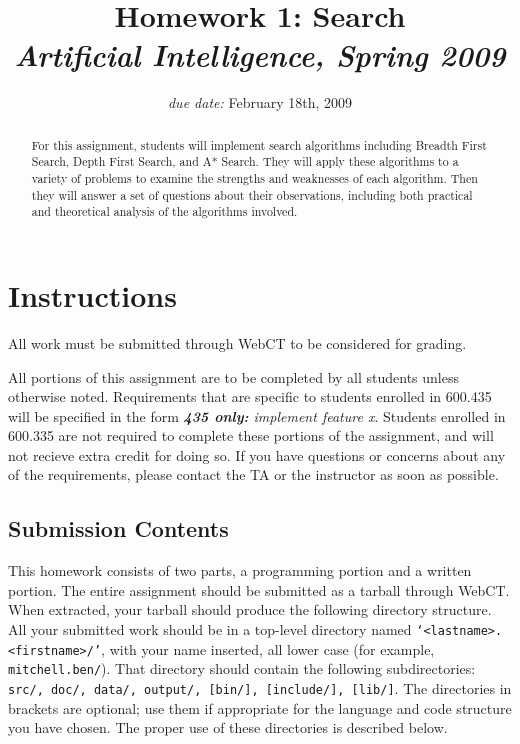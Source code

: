 \documentclass[12pt]{article}
\title{Homework 1: Search\\ \normalsize\emph{Artificial Intelligence, Spring 2009}}
\date{\emph{due date:} February 18th, 2009}
\newcommand{\ttt}[1]{\texttt{#1}}
\begin{document}
\maketitle

\begin{abstract}
  For this assignment, students will implement search algorithms including
  Breadth First Search, Depth First Search, and A* Search.  They will apply
  these algorithms to a variety of problems to examine the strengths and
  weaknesses of each algorithm.  Then they will answer a set of questions about
  their observations, including both practical and theoretical analysis of the
  algorithms involved.
\end{abstract}

\section{Instructions}

All work must be submitted through WebCT to be considered for grading.

All portions of this assignment are to be completed by all students unless
otherwise noted.  Requirements that are specific to students enrolled in 600.435
will be specified in the form \emph{\textbf{435 only:} implement feature x}.
Students enrolled in 600.335 are not required to complete these portions of the
assignment, and will not recieve extra credit for doing so.  If you have
questions or concerns about any of the requirements, please contact the TA or
the instructor as soon as possible.

\subsection{Submission Contents}
This homework consists of two parts, a programming portion and a written
portion.  The entire assignment should be submitted as a tarball through WebCT.
When extracted, your tarball should produce the following directory structure.
All your submitted work should be in a top-level directory named
\ttt{`<lastname>.<firstname>/'}, with your name inserted, all lower case (for
example, \ttt{mitchell.ben/}).  That directory should contain the following
subdirectories: \ttt{src/, doc/, data/, output/, [bin/], [include/], [lib/]}.
The directories in brackets are optional; use them if appropriate for the
language and code structure you have chosen.  The proper use of these
directories is described below.  
\end{document}
